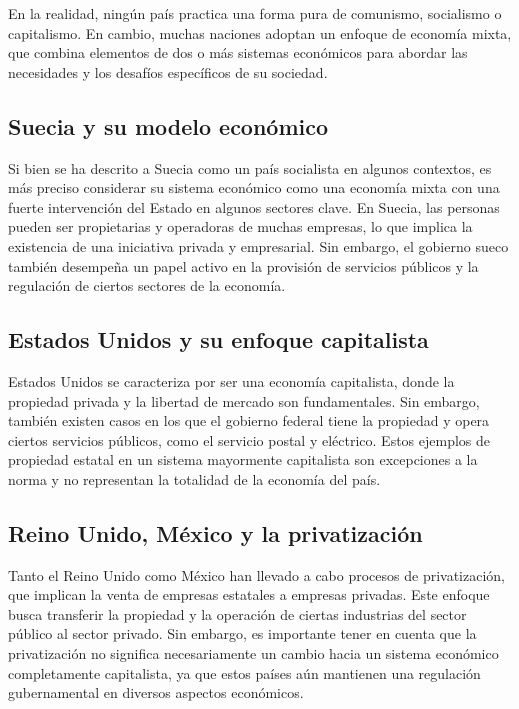 \documentclass[
  letterpaper,
  DIV=11,
  numbers=noendperiod]{scrartcl}
\begin{document}
En la realidad, ningún país practica una forma pura de comunismo,
socialismo o capitalismo. En cambio, muchas naciones adoptan un enfoque
de economía mixta, que combina elementos de dos o más sistemas
económicos para abordar las necesidades y los desafíos específicos de su
sociedad.

\hypertarget{suecia-y-su-modelo-econuxf3mico}{%
\subsection{Suecia y su modelo
económico}\label{suecia-y-su-modelo-econuxf3mico}}

Si bien se ha descrito a Suecia como un país socialista en algunos
contextos, es más preciso considerar su sistema económico como una
economía mixta con una fuerte intervención del Estado en algunos
sectores clave. En Suecia, las personas pueden ser propietarias y
operadoras de muchas empresas, lo que implica la existencia de una
iniciativa privada y empresarial. Sin embargo, el gobierno sueco también
desempeña un papel activo en la provisión de servicios públicos y la
regulación de ciertos sectores de la economía.

\hypertarget{estados-unidos-y-su-enfoque-capitalista}{%
\subsection{Estados Unidos y su enfoque
capitalista}\label{estados-unidos-y-su-enfoque-capitalista}}

Estados Unidos se caracteriza por ser una economía capitalista, donde la
propiedad privada y la libertad de mercado son fundamentales. Sin
embargo, también existen casos en los que el gobierno federal tiene la
propiedad y opera ciertos servicios públicos, como el servicio postal y
eléctrico. Estos ejemplos de propiedad estatal en un sistema mayormente
capitalista son excepciones a la norma y no representan la totalidad de
la economía del país.

\hypertarget{reino-unido-muxe9xico-y-la-privatizaciuxf3n}{%
\subsection{Reino Unido, México y la
privatización}\label{reino-unido-muxe9xico-y-la-privatizaciuxf3n}}

Tanto el Reino Unido como México han llevado a cabo procesos de
privatización, que implican la venta de empresas estatales a empresas
privadas. Este enfoque busca transferir la propiedad y la operación de
ciertas industrias del sector público al sector privado. Sin embargo, es
importante tener en cuenta que la privatización no significa
necesariamente un cambio hacia un sistema económico completamente
capitalista, ya que estos países aún mantienen una regulación
gubernamental en diversos aspectos económicos.
\end{document}
